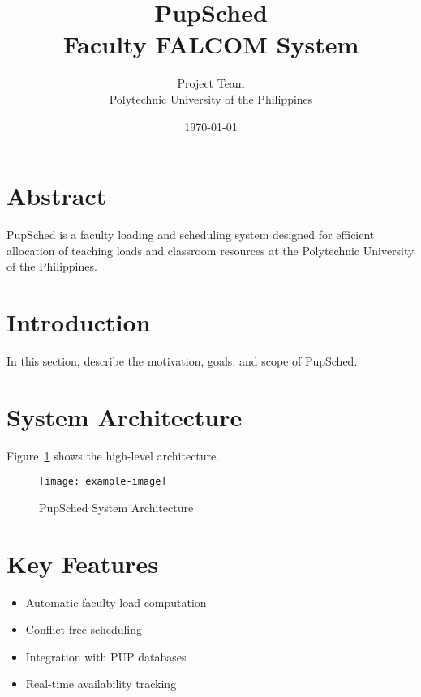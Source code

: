 \documentclass[12pt,a4paper]{article}
\title{\textbf{\textcolor{pupred}{PupSched}} \\ Faculty FALCOM System}
\author{Project Team \\ Polytechnic University of the Philippines}
\date{\today}
\begin{document}
\maketitle
\thispagestyle{empty}
\newpage

\tableofcontents
\newpage

\section{Abstract}
PupSched is a faculty loading and scheduling system designed for efficient allocation of teaching loads and classroom resources at the Polytechnic University of the Philippines.

\section{Introduction}
In this section, describe the motivation, goals, and scope of PupSched.

\section{System Architecture}
Figure~\ref{fig:arch} shows the high-level architecture.

\begin{figure}[h]
    \centering
    \texttt{[image: example-image]} %
    \caption{PupSched System Architecture}
    \label{fig:arch}
\end{figure}

\section{Key Features}
\begin{itemize}
    \item Automatic faculty load computation
    \item Conflict-free scheduling
    \item Integration with PUP databases
    \item Real-time availability tracking
\end{itemize}
\end{document}
